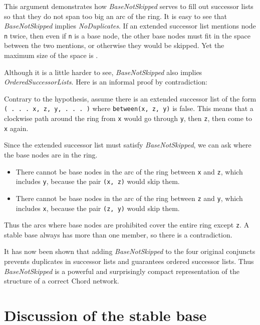 \documentclass[conference]{IEEEtran}
\begin{document}
This argument demonstrates how {\it BaseNotSkipped} serves to fill out
successor lists so that they do not span too big an arc of the ring.
It is easy to see that {\it BaseNotSkipped} implies
{\it NoDuplicates}.
If an extended successor list mentions node 
\small
{\tt n}
\normalsize
twice, then even if
\small
{\tt n}
\normalsize
is a base node, the other  base nodes must fit in the space between
the two mentions, or otherwise they would be skipped.
Yet the maximum size of the space is .

Although it is a little harder to see, {\it BaseNotSkipped}
also implies {\it OrderedSuccessorLists}.
Here is an informal
proof by contradiction:

Contrary to the hypothesis, assume there is an extended successor
list of the form
\small
{\tt ( . . . x, z, y, . . . )}
\normalsize
where 
\small
{\tt between(x, z, y)}
\normalsize
is false.
This means that a clockwise path around the ring from
\small
{\tt x}
\normalsize
would go through 
\small
{\tt y},
\normalsize
then
\small
{\tt z},
\normalsize
then come to
\small
{\tt x}
\normalsize
again.

Since the extended successor list must satisfy {\it BaseNotSkipped},
we can ask where the base nodes are in the ring.
\begin{itemize}
\item
There cannot be base nodes in the arc of the ring between
\small
{\tt x}
\normalsize
and 
\small
{\tt z},
\normalsize
which includes
\small
{\tt y},
\normalsize
because the pair
\small
{\tt (x, z)}
\normalsize
would skip them.
\item
There cannot be base nodes in the arc of the ring between
\small
{\tt z}
\normalsize
and
\small
{\tt y},
\normalsize
which includes
\small
{\tt x},
\normalsize
because the pair
\small
{\tt (z, y)}
\normalsize
would skip them.
\end{itemize}
Thus the arcs where base nodes are prohibited cover the entire ring
except
\small
{\tt z}.
\normalsize
A stable base always has more than one member, so there is a contradiction.

It has now been shown that
adding {\it BaseNotSkipped}
to the four original conjuncts
prevents duplicates in successor lists and guarantees ordered
successor lists.
Thus {\it BaseNotSkipped} is a powerful and surprisingly
compact representation
of the structure of a correct Chord network.

\section{Discussion of the stable base}
\label{sec:stable}
\end{document}
